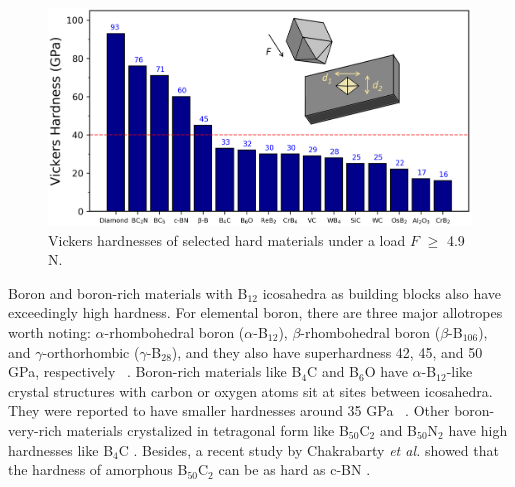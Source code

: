     \begin{figure}[t]
        \centering
        \captionsetup{singlelinecheck = false, justification=justified}
        \includegraphics[width=1.0\textwidth]{superhard_materials.png}
        \caption[Vickers hardnesses of selected hard materials]{Vickers hardnesses of selected hard materials under a load $F$ $\geq$ 4.9 N.}
        \label{fig:2}
    \end{figure}


Boron and boron-rich materials with B$_{12}$ icosahedra as building blocks also have exceedingly high hardness. For elemental boron, there are three major allotropes worth noting: $\alpha$-rhombohedral boron ($\alpha$-B$_{12}$), $\beta$-rhombohedral boron ($\beta$-B$_{106}$), and $\gamma$-orthorhombic ($\gamma$-B$_{28}$), and they also have superhardness 42, 45, and 50 GPa, respectively ~\cite{solozhenko2008hardness}. Boron-rich materials like B$_4$C and B$_6$O have $\alpha$-B$_{12}$-like crystal structures with carbon or oxygen atoms sit at sites between icosahedra. They were reported to have smaller hardnesses around 35 GPa ~\cite{kovziridze2013improvement, sairam2012development, jiao2010synthesis}. Other boron-very-rich materials crystalized in tetragonal form like B$_{50}$C$_2$ and B$_{50}$N$_2$ have high hardnesses like B$_4$C \cite{baker2020first}. Besides, a recent study by Chakrabarty {\it et al.} showed that the hardness of amorphous B$_{50}$C$_2$ can be as hard as c-BN \cite{chakrabarty2020superhard}.

